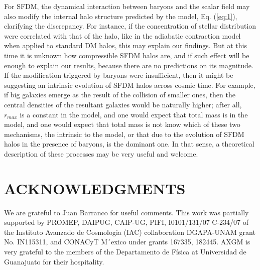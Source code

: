 \documentclass[10pt, letterpaper]{article}
\begin{document}
\begin{multicols}{2}
		For SFDM, the dynamical interaction between baryons and the scalar field may also modify the internal halo structure predicted by the model, Eq. (\ref{eq:1}), clarifying the discrepancy. For instance, if the concentration of stellar distribution were correlated with that of the halo, like in the adiabatic contraction model when applied to standard DM halos, this may explain our findings. But at this time it is unknown how compressible SFDM halos are, and if such effect will be enough to explain our results, because there are no predictions on its magnitude. If the modification triggered by baryons were insufficient, then it might be suggesting an intrinsic evolution of SFDM halos across cosmic time. For example, if big galaxies emerge as the result of the collision of smaller ones, then the central densities of the resultant galaxies would be naturally higher; after all, $r_{max}$ is a constant in the model, and one would expect that total mass is in the model, and one would expect that total mass is not know which of these two mechanisms, the intrinsic to the model, or that due to the evolution of SFDM halos in the presence of baryons, is the dominant one. In that sense, a theoretical description of these processes may be very useful and welcome.
		\section{\centering\small\selectfont ACKNOWLEDGMENTS}
		We are grateful to Juan Barranco for useful comments. This work was partially supported by PROMEP, DAIPUG, CAIP-UG, PIFI, I0101/131/07 C-234/07 of the Instituto Avanzado de Cosmologia (IAC) collaboration DGAPA-UNAM grant No. IN115311, and CONACyT M´exico under grants 167335, 182445. AXGM is very grateful to the members of the Departamento de Física at Universidad de Guanajuato for their hospitality.
		
		
		
	\end{multicols}
\end{document}

